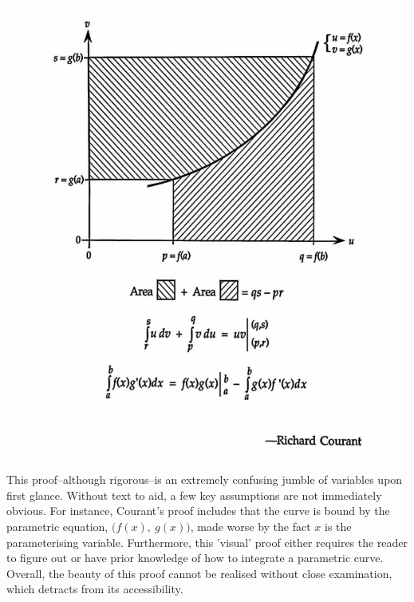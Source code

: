 \documentclass[11pt,a4paper]{article}
\begin{document}
\begin{figure}[h]
\begin{center}
\includegraphics[scale=.5]{proof of ibp} 
\end{center}
\end{figure}

This proof--although rigorous--is an extremely confusing jumble of variables upon first glance.  Without text to aid, a few key assumptions are not immediately obvious. For instance, Courant's proof includes that the curve is bound by the parametric equation, $ \big( f(x), \ g(x) \big) $, made worse by the fact $x$ is the parameterising variable.  Furthermore, this 'visual' proof either requires the reader to figure out or have prior knowledge of how to integrate a parametric curve. Overall, the beauty of this proof cannot be realised without close examination, which detracts from its accessibility.
\pagebreak
\end{document}
